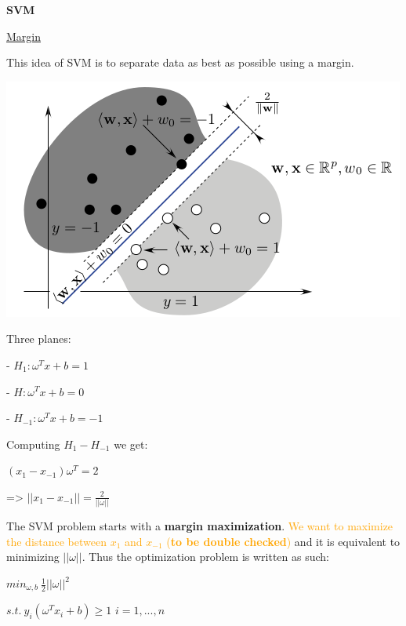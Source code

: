 {\fontsize{12pt}{22pt} \textbf{SVM}\par}

\vspace{5mm}

\underline{Margin}

\vspace{5mm}

This idea of SVM is to separate data as best as possible using a margin.

\begin{center}
\includegraphics[scale=0.6]{SVM.png}
\end{center}

Three planes:

- $H_1: \omega^Tx+b=1$

- $H: \omega^Tx+b=0$

- $H_{-1}: \omega^Tx+b=-1$

\vspace{5mm}

Computing $H_1 - H_{-1}$ we get:

$(x_1-x_{-1})\omega^T=2$

=> $||x_1-x_{-1}||=\frac{2}{||\omega||}$

\vspace{5mm}

The SVM problem starts with a \textbf{margin maximization}. \textcolor{orange}{We want to maximize the distance between $x_1$ and $x_{-1}$ (\textbf{to be double checked})} and it is equivalent to minimizing $||\omega||$. Thus the optimization problem is written as such:

\begin{center}
$min_{\omega,b}~\frac{1}{2}||\omega||^2$

$s.t.~y_i(\omega^Tx_i+b) \geq 1$ $i=1,...,n$
\end{center}

